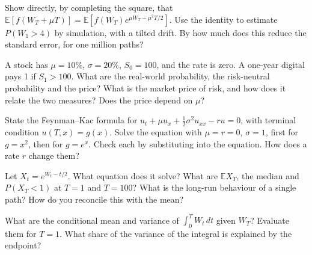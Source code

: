 \begin{question}\label{iq:iv1:stochastic-calculus:17}
Show directly, by completing the square, that $\mathbb{E}[f(W_T + \mu T)] = \mathbb{E}[f(W_T)e^{\mu W_T - \mu^2T/2}]$. Use the identity to estimate $P(W_1 > 4)$ by simulation, with a tilted drift. By how much does this reduce the standard error, for one million paths?
\end{question}

\begin{question}\label{iq:iv1:stochastic-calculus:18}
A stock has $\mu = 10\%$, $\sigma = 20\%$, $S_0 = 100$, and the rate is zero. A one-year digital pays 1 if $S_1 > 100$. What are the real-world probability, the risk-neutral probability and the price? What is the market price of risk, and how does it relate the two measures? Does the price depend on $\mu$?
\end{question}

\begin{question}\label{iq:iv1:stochastic-calculus:19}
State the Feynman--Kac formula for $u_t + \mu u_x + \frac12\sigma^2u_{xx} - ru = 0$, with terminal condition $u(T, x) = g(x)$. Solve the equation with $\mu = r = 0$, $\sigma = 1$, first for $g = x^2$, then for $g = e^x$. Check each by substituting into the equation. How does a rate $r$ change them?
\end{question}

\begin{question}\label{iq:iv1:stochastic-calculus:20}
Let $X_t = e^{W_t - t/2}$. What equation does it solve? What are $\mathbb{E}X_T$, the median and $P(X_T < 1)$ at $T = 1$ and $T = 100$? What is the long-run behaviour of a single path? How do you reconcile this with the mean?
\end{question}

\begin{question}\label{iq:iv1:stochastic-calculus:21}
What are the conditional mean and variance of $\int_0^TW_t\,dt$ given $W_T$? Evaluate them for $T = 1$. What share of the variance of the integral is explained by the endpoint?
\end{question}


